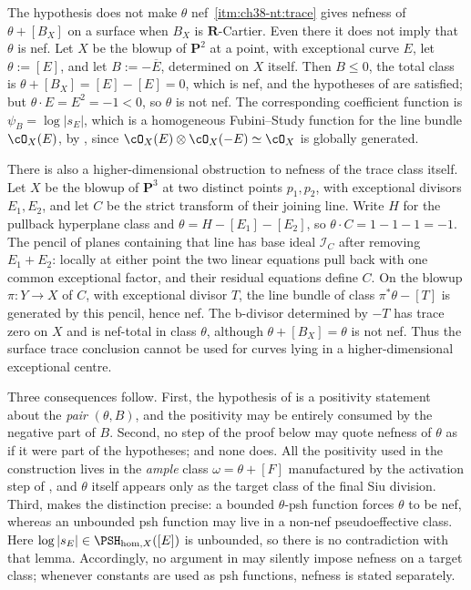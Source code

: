\begin{warning}{The hypothesis does not make $\theta$ nef}
\label{warn:ch38-theta-not-nef}
\,\cref{itm:ch38-nt:trace} gives
nefness of $\theta+[B_X]$ on a surface when $B_X$ is
$\mathbf R$-Cartier. Even there it does not imply that $\theta$
is nef.  Let $X$ be the blowup of
$\mathbf P^2$ at a point, with exceptional curve $E$, let
$\theta:=[E]$, and let $B:=-\overline E$, determined on $X$ itself.
Then $B\leq0$, the total class is
$\theta+[B_X]=[E]-[E]=0$, which is nef, and the hypotheses of
 are satisfied; but
$\theta\cdot E=E^2=-1<0$, so $\theta$ is not nef.  The corresponding
coefficient function is $\psi_B=\log|s_E|$, which is a homogeneous
Fubini--Study function for the line bundle $\cO_X(E)$, by
, since
$\cO_X(E)\otimes\cO_X(-E)\simeq\cO_X$ is globally generated.

There is also a higher-dimensional obstruction to nefness of the
trace class itself. Let $X$ be the blowup of $\mathbf P^3$ at two
distinct points $p_1,p_2$, with exceptional divisors $E_1,E_2$,
and let $C$ be the strict transform of their joining line.
Write $H$ for the pullback hyperplane class and
$\theta=H-[E_1]-[E_2]$, so $\theta\cdot C=1-1-1=-1$.
The pencil of planes containing that line has base ideal
$\mathcal I_C$ after removing $E_1+E_2$: locally at either point
the two linear equations pull back with one common exceptional
factor, and their residual equations define $C$.
On the blowup $\pi:Y\to X$ of $C$, with exceptional divisor $T$,
the line bundle of class $\pi^*\theta-[T]$ is generated by this
pencil, hence nef. The b-divisor determined by $-T$ has trace zero
on $X$ and is nef-total in class $\theta$, although
$\theta+[B_X]=\theta$ is not nef. Thus the surface trace conclusion
cannot be used for curves lying in a higher-dimensional exceptional
centre.

Three consequences follow. First, the hypothesis
of  is a positivity statement about
the \emph{pair} $(\theta,B)$, and the positivity may be entirely consumed
by the negative part of $B$.  Second, no step of the proof below may
quote nefness of $\theta$ as if it were part of the hypotheses; and none
does.  All the positivity used in the construction lives in the
\emph{ample} class $\omega=\theta+[F]$ manufactured by the activation
step of , and $\theta$ itself appears only as
the target class of the final Siu division.  Third,
 makes the distinction precise: a bounded
$\theta$-psh function forces $\theta$ to be nef, whereas an unbounded
psh function may live in a non-nef pseudoeffective class.  Here
$\log|s_E|\in\PSH_{\mathrm{hom},X}([E])$ is unbounded, so there is no
contradiction with that lemma.  Accordingly, no argument in
 may
silently impose nefness on a target class; whenever constants are used as
psh functions, nefness is stated separately.
\end{warning}

